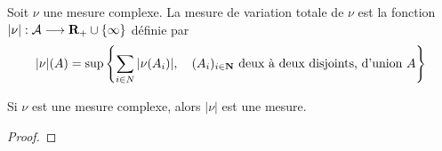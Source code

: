 \begin{dfn}
    Soit $\nu$ une mesure complexe. La mesure de variation totale de  $\nu$  est la fonction  $|\nu|:\mathcal  A \longrightarrow \mathbf R_+\cup \left\{ \infty \right\} $ définie par \[
        |\nu|(A) = \sup \left\{ \sum_{i \in  N}|\nu(A_i)|, \quad  (A_i)_{i \in  \mathbf N} \text{ deux à deux disjoints, d'union } A\right\} 
    \] 
\end{dfn}

\begin{prop}
Si $\nu$ est une mesure complexe, alors  $|\nu|$ est une mesure.
\end{prop}

\begin{proof}

\end{proof}
